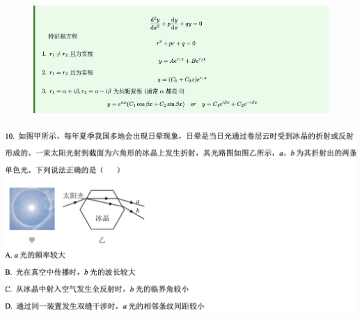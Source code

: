 \documentclass{article}
\begin{document}
        \begin{figure}[h]
            \centering
            \includegraphics[width=\textwidth,keepaspectratio]{./pictures/1.3-10.png}
        \end{figure}

        
        \subsubsection{}
        \includegraphics[width=50em,keepaspectratio]{./pictures/1.3-11.png}
\end{document}
